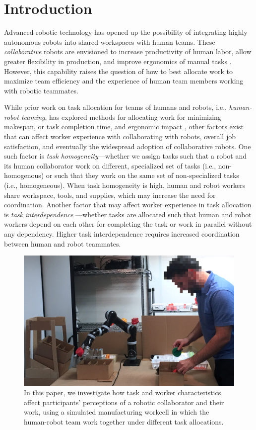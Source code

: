 \section{Introduction}
Advanced robotic technology has opened up the possibility of integrating highly autonomous robots into shared workspaces with human teams. These \textit{collaborative} robots are envisioned to increase productivity of human labor, allow greater flexibility in production, and improve ergonomics of manual tasks \cite{peshkin1999cobots, tan2009human}. However, this capability raises the question of how to best allocate work to maximize team efficiency and the experience of human team members working with robotic teammates.
       
While prior work on task allocation for teams of humans and robots, i.e., \textit{human-robot teaming}, has explored methods for allocating work for minimizing makespan, or task completion time, and ergonomic impact \cite{shah2011improved, gombolay2014decision, tsarouchi2017ijcim}, other factors exist that can affect worker experience with collaborating with robots, overall job satisfaction, and eventually the widespread adoption of collaborative robots. One such factor is \textit{task homogeneity}---whether we assign tasks such that a robot and its human collaborator work on different, specialized set of tasks (i.e., non-homogenous) or such that they work on the same set of non-specialized tasks (i.e., homogeneous). When task homogeneity is high, human and robot workers share workspace, tools, and supplies, which may increase the need for coordination. Another factor that may affect worker experience in task allocation is \textit{task interdependence} \cite{kiggundu1983task}---whether tasks are allocated such that human and robot workers depend on each other for completing the task or work in parallel without any dependency. Higher task interdependence requires increased coordination between human and robot teammates. 

\begin{figure}[t!]
	\caption{In this paper, we investigate how task and worker characteristics affect participants' perceptions of a robotic collaborator and their work, using a simulated manufacturing workcell in which the human-robot team work together under different task allocations.}\vspace{4pt}
	\label{fig:teaser}
	\includegraphics[width=\columnwidth]{figures/teaser.png}
\end{figure} 


